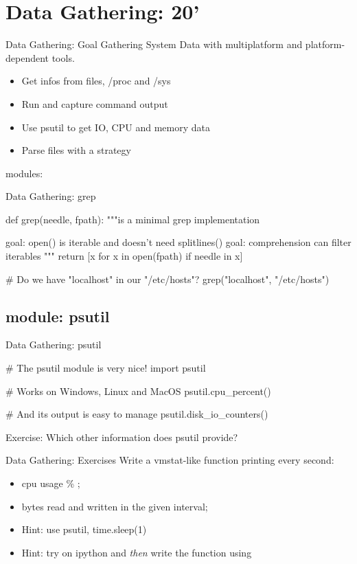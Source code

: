 \section{Data Gathering: 20'}
%
%


\begin{pyframe}{Data Gathering: Goal}
    Gathering System Data with multiplatform
     and platform-dependent tools.
\begin{itemize}
\item Get infos from files, /proc and /sys 
\item Run and capture command output
\item Use psutil to get IO, CPU and memory data
\item Parse files with a strategy
\end{itemize}
modules: 
\end{pyframe}


\begin{pyframe}{Data Gathering: grep}
\begin{pycode}
def grep(needle, fpath):
    """is a minimal grep implementation

       goal: open() is iterable and doesn't
             need splitlines()
       goal: comprehension can filter iterables
    """
    return [x for x in open(fpath) if needle in x]
    
# Do we have "localhost" in our "/etc/hosts"?
grep("localhost", "/etc/hosts")
\end{pycode}
\end{pyframe}

\subsection{module: psutil}
\begin{pyframe}{Data Gathering: psutil}
\begin{pycode}
# The psutil module is very nice!
import psutil

# Works on Windows, Linux and MacOS
psutil.cpu_percent()

# And its output is easy to manage
psutil.disk_io_counters()

\end{pycode}
Exercise: Which other information does psutil provide?
\end{pyframe}


\begin{pyframe}{Data Gathering: Exercises}
Write a vmstat-like function printing every second:
\begin{itemize}
\item cpu usage \% ;
\item bytes read and written in the given interval;
\item Hint: use psutil, time.sleep(1)
\item Hint: try on ipython and \emph{then} write the function using \\\\
\end{itemize}
\end{pyframe}

